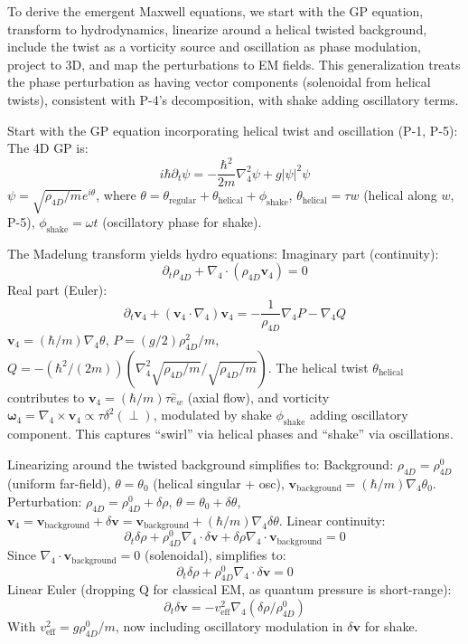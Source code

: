 To derive the emergent Maxwell equations, we start with the GP equation, transform to hydrodynamics, linearize around a helical twisted background, include the twist as a vorticity source and oscillation as phase modulation, project to 3D, and map the perturbations to EM fields. This generalization treats the phase perturbation as having vector components (solenoidal from helical twists), consistent with P-4's decomposition, with shake adding oscillatory terms.

Start with the GP equation incorporating helical twist and oscillation (P-1, P-5): The 4D GP is:
\[ i \hbar \partial_t \psi = - \frac{\hbar^2}{2m} \nabla_4^2 \psi + g |\psi|^2 \psi \]
$\psi = \sqrt{\rho_{4D} / m} e^{i \theta}$, where $\theta = \theta_{\text{regular}} + \theta_{\text{helical}} + \phi_{\text{shake}}$, $\theta_{\text{helical}} = \tau w$ (helical along $w$, P-5), $\phi_{\text{shake}} = \omega t$ (oscillatory phase for shake).

The Madelung transform yields hydro equations: Imaginary part (continuity):
\[ \partial_t \rho_{4D} + \nabla_4 \cdot (\rho_{4D} \mathbf{v}_4) = 0 \]
Real part (Euler):
\[ \partial_t \mathbf{v}_4 + (\mathbf{v}_4 \cdot \nabla_4) \mathbf{v}_4 = - \frac{1}{\rho_{4D}} \nabla_4 P - \nabla_4 Q \]
$\mathbf{v}_4 = (\hbar / m) \nabla_4 \theta$, $P = (g / 2) \rho_{4D}^2 / m$, $Q = - (\hbar^2 / (2m)) (\nabla_4^2 \sqrt{\rho_{4D} / m} / \sqrt{\rho_{4D} / m})$. The helical twist $\theta_{\text{helical}}$ contributes to $\mathbf{v}_4 = (\hbar / m) \tau \hat{e}_w$ (axial flow), and vorticity $\boldsymbol{\omega}_4 = \nabla_4 \times \mathbf{v}_4 \propto \tau \delta^2(\perp)$, modulated by shake $\phi_{\text{shake}}$ adding oscillatory component. This captures ``swirl'' via helical phases and ``shake'' via oscillations.

Linearizing around the twisted background simplifies to: Background: $\rho_{4D} = \rho_{4D}^0$ (uniform far-field), $\theta = \theta_0$ (helical singular + osc), $\mathbf{v}_{\text{background}} = (\hbar / m) \nabla_4 \theta_0$. Perturbation: $\rho_{4D} = \rho_{4D}^0 + \delta\rho$, $\theta = \theta_0 + \delta\theta$, $\mathbf{v}_4 = \mathbf{v}_{\text{background}} + \delta\mathbf{v} = \mathbf{v}_{\text{background}} + (\hbar / m) \nabla_4 \delta\theta$. Linear continuity:
\[ \partial_t \delta \rho + \rho_{4D}^0 \nabla_4 \cdot \delta \mathbf{v} + \delta \rho \nabla_4 \cdot \mathbf{v}_{\text{background}} = 0 \]
Since $\nabla_4 \cdot \mathbf{v}_{\text{background}} = 0$ (solenoidal), simplifies to:
\[ \partial_t \delta \rho + \rho_{4D}^0 \nabla_4 \cdot \delta \mathbf{v} = 0 \]
Linear Euler (dropping Q for classical EM, as quantum pressure is short-range):
\[ \partial_t \delta \mathbf{v} = - v_{\text{eff}}^2 \nabla_4 (\delta \rho / \rho_{4D}^0) \]
With $v_{\text{eff}}^2 = g \rho_{4D}^0 / m$, now including oscillatory modulation in $\delta \mathbf{v}$ for shake.

